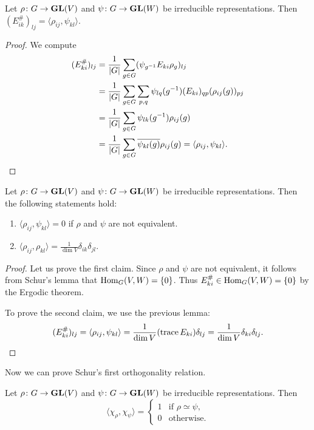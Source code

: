 \begin{lemma}
Let $\rho\colon G\to\mathbf{GL}(V)$ and $\psi\colon G\to\mathbf{GL}(W)$ be irreducible representations. Then
$(E_{ik}^\#)_{lj}=\langle\rho_{ij},\psi_{kl}\rangle$.
\end{lemma}

\begin{proof}
  We compute
  \begin{align*}
      (E_{ki}^\#)_{lj} &= \frac{1}{|G|}\sum_{g\in G}(\psi_{g^{-1}}E_{ki}\rho_g)_{lj}\\
      &=\frac{1}{|G|}\sum_{g\in G}\sum_{p,q}\psi_{lq}(g^{-1})(E_{ki})_{qp}(\rho_{ij}(g))_{pj}\\
      &=\frac{1}{|G|}\sum_{g\in G}\psi_{lk}(g^{-1})\rho_{ij}(g)\\
      &=\frac{1}{|G|}\sum_{g\in G}\overline{\psi_{kl}(g)}\rho_{ij}(g)=\langle \rho_{ij},\psi_{kl}\rangle.\qedhere
  \end{align*}
\end{proof}

\begin{theorem}[Schur]
    Let $\rho\colon G\to\mathbf{GL}(V)$ and $\psi\colon G\to\mathbf{GL}(W)$ be irreducible representations. 
    Then the following statements hold:
    \begin{enumerate}
        \item $\langle\rho_{ij},\psi_{kl}\rangle=0$ if $\rho$ and $\psi$ are not equivalent.
        \item $\displaystyle{\langle\rho_{ij},\rho_{kl}\rangle=\frac{1}{\dim V}\delta_{ik}\delta_{jl}}$.
    \end{enumerate}
\end{theorem}

\begin{proof}
    Let us prove the first claim. Since 
    $\rho$ and $\psi$ 
    are not equivalent, it follows from Schur's lemma that $\operatorname{Hom}_G(V,W)=\{0\}$.
    Thus $E_{ki}^\#\in\operatorname{Hom}_G(V,W)=\{0\}$ by the Ergodic theorem. 
    
    To prove the second claim, we use the previous lemma:
    \[
    (E_{ki}^\#)_{lj}=\langle\rho_{ij},\psi_{kl}\rangle
    =\frac{1}{\dim V}(\operatorname{trace} E_{ki})\delta_{lj}
    =\frac{1}{\dim V}\delta_{ki}\delta_{lj}.\qedhere
    \]
\end{proof}

Now we can prove Schur's first orthogonality relation.

\begin{theorem}[Schur]
Let $\rho\colon G\to\mathbf{GL}(V)$ and $\psi\colon G\to\mathbf{GL}(W)$ be irreducible representations. Then
\[
\langle\chi_\rho,\chi_\psi\rangle=
\begin{cases}
1 & \text{if $\rho\simeq\psi$,}\\
0 & \text{otherwise.}
\end{cases}
\]
\end{theorem}

